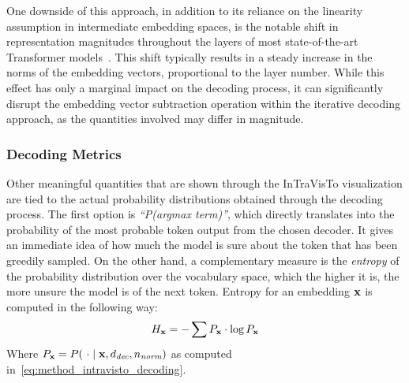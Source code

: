 One downside of this approach, in addition to its reliance on the linearity assumption in intermediate embedding spaces, is the notable shift in representation magnitudes throughout the layers of most state-of-the-art Transformer models~\cite{heimersheim2023}.
This shift typically results in a steady increase in the norms of the embedding vectors, proportional to the layer number.
While this effect has only a marginal impact on the decoding process, it can significantly disrupt the embedding vector subtraction operation within the iterative decoding approach, as the quantities involved may differ in magnitude.

\subsubsection{Decoding Metrics}\label{sssec:method_intravisto_decoding_metrics}

Other meaningful quantities that are shown through the InTraVisTo visualization are tied to the actual probability distributions obtained through the decoding process.
The first option is \emph{``P(argmax term)''}, which directly translates into the probability of the most probable token output from the chosen decoder. %
It gives an immediate idea of how much the model is sure about the token that has been greedily sampled.
On the other hand, a complementary measure is the \emph{entropy} of the probability distribution over the vocabulary space, which the higher it is, the more unsure the model is of the next token.
Entropy for an embedding $\bm{\mathbf{x}}$ is computed in the following way:
\begin{equation*}
    \label{eq:method_intravisto_entropy}
    H_{\bm{\mathbf{x}}} = -\sum{P_{\bm{\mathbf{x}}} \cdot \log{P_{\bm{\mathbf{x}}}}}
\end{equation*}
Where $P_{\bm{\mathbf{x}}} = P(\ \cdot \mid \bm{\mathbf{x}}, d_\textit{dec}, n_\textit{norm})$ as computed in~\cref{eq:method_intravisto_decoding}.

